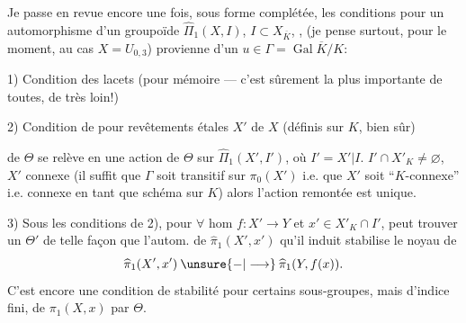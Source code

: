 Je passe en revue encore une fois, sous forme complétée, les conditions pour un automorphisme \inserted{$\Theta$} d'un groupoïde $\widehat{\Pi}_1(X,I)$, $I\subset X_{\overline{K}}$, , (je pense surtout, pour le moment, au cas $X=U_{0,3}$) provienne d'un $u\in\Gamma=\operatorname{Gal}\overline{K}/K$:

1) Condition des lacets (pour mémoire --- c'est sûrement la plus importante de toutes, de très loin!)

2) Condition de  pour revêtements étales  $X'$ de $X$ (définis sur $K$, bien sûr)


de $\Theta$ se relève en une action de $\Theta$ sur $\widehat{\Pi}_1(X',I')$, où $I'=X'\vert I$.
 $I'\cap X'_K\ne\varnothing$, $X'$  connexe (il suffit que $\Gamma$ soit transitif sur $\pi_0(X')$ i.e. que $X'$ soit ``$K$-connexe'' i.e. connexe en tant que schéma sur $K$) alors l'action remontée est unique.


3) Sous les conditions de 2), pour $\forall$ hom $f:X'\longrightarrow Y$ et  $x'\in X'_K\cap I'$,   peut trouver un $\Theta'$  de telle façon que l'autom. de $\widehat{\pi}_1(X',x')$ qu'il induit  stabilise le noyau de
\[
\widehat{\pi}_1(X',x')\mathbin{\unsure{-|\longrightarrow}}\widehat{\pi}_1(Y,f(x)).
\]
C'est encore une condition de stabilité pour certains sous-groupes, mais  d'indice fini, de $\pi_1(X,x)$ par $\Theta$.


